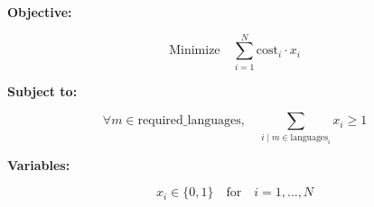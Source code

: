 \documentclass{article}
\begin{document}
\textbf{Objective:}

\[
\text{Minimize} \quad \sum_{i=1}^{N} \text{cost}_i \cdot x_i
\]

\textbf{Subject to:}

\[
\forall m \in \text{required\_languages}, \quad \sum_{i \mid m \in \text{languages}_i} x_i \geq 1
\]

\textbf{Variables:}

\[
x_i \in \{0, 1\} \quad \text{for} \quad i = 1, \ldots, N
\]
\end{document}
